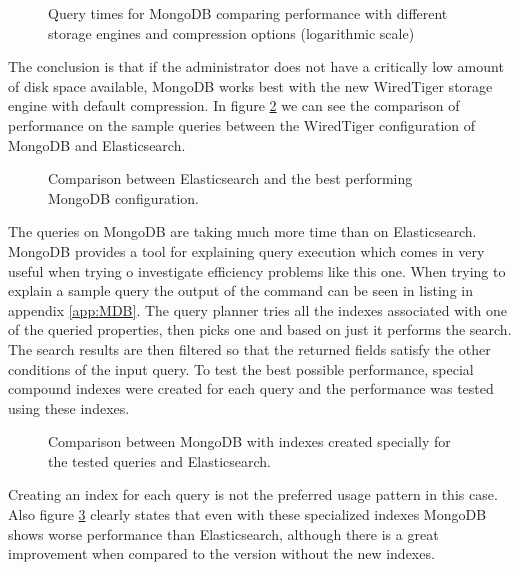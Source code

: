 \begin{figure}[h]
	\centering
	
	\caption{Query times for MongoDB comparing performance with different storage engines and compression 
	options (logarithmic scale)}
	\label{fig:MDBcomparison}
\end{figure}

The conclusion is that if the administrator does not have a critically low amount of disk space available, MongoDB
works best with the new WiredTiger storage engine with default compression. In figure \ref{fig:DBscomparison} we 
can see the comparison of performance on the sample queries between the WiredTiger configuration of MongoDB and 
Elasticsearch. 

\begin{figure}[h]
	\centering
	
	\caption{Comparison between Elasticsearch and the best performing MongoDB configuration.}
	\label{fig:DBscomparison}
\end{figure}

The queries on MongoDB are taking much more time than on Elasticsearch. MongoDB provides
a tool for explaining query execution which comes in very useful when trying o investigate efficiency problems
like this one. When trying to explain a sample query the output of the command can be seen in listing in appendix 
\ref{app:MDB}. The query planner tries all the indexes associated with one of the queried properties, then 
picks one and based on just it performs the search. The search results are then filtered so that the returned 
fields satisfy the other conditions of the input query. To test the best possible performance, special compound 
indexes were created for each query and the performance was tested using these indexes. 

\begin{figure}[h]
	\centering
	
	\caption{Comparison between MongoDB with indexes created specially for the tested queries and Elasticsearch.}
	\label{fig:MDBcompound}
\end{figure}

Creating an index for each query is not the preferred usage pattern in this case. Also figure 
\ref{fig:MDBcompound} clearly states that even with these specialized indexes MongoDB shows worse performance 
than Elasticsearch, although there is a great improvement when compared to the version without the new indexes.  

